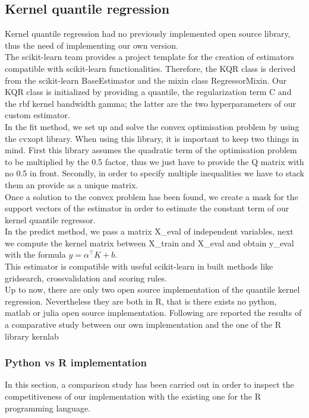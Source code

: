 \subsection{Kernel quantile regression}
Kernel quantile regression had no previously implemented open source library, thus the need of implementing our own version.
\\
The scikit-learn team provides a project template for the creation of estimators compatible with scikit-learn functionalities. Therefore, the KQR class is derived from the scikit-learn BaseEstimator and the mixin class RegressorMixin.
Our KQR class is initialized by providing a quantile, the regularization term C and the rbf kernel bandwidth gamma; the latter are the two hyperparameters of our custom estimator.
\\
In the fit method, we set up and solve the convex optimisation problem by using the cvxopt library. 
When using this library, it is important to keep two things in mind. First this library assumes the quadratic term of the optimisation problem to be multiplied by the 0.5 factor, thus we just have to provide the Q matrix with no 0.5 in front.
Secondly, in order to specify multiple inequalities we have to stack them an provide as a unique matrix.
\\
Once a solution to the convex problem has been found, we create a mask for the support vectors of the estimator in order to estimate the constant term of our kernel quantile regressor.
\\
In the predict method, we pass a matrix X\_eval of independent variables, next we compute the kernel matrix between X\_train and X\_eval and obtain y\_eval with the formula $y=\alpha^\intercal K+b$.
\\
This estimator is compatible with useful scikit-learn in built methods like gridsearch, crossvalidation and scoring rules.
\\
Up to now, there are only two open source implementation of the quantile kernel regression. Nevertheless they are both in R, that is there exists no python, matlab or julia open source implementation. Following are reported the results of a comparative study between our own implementation and the one of the R library kernlab
\subsubsection{Python vs R implementation}
In this section, a comparison study has been carried out in order to inspect the competitiveness of our implementation with the existing one for the R programming language.